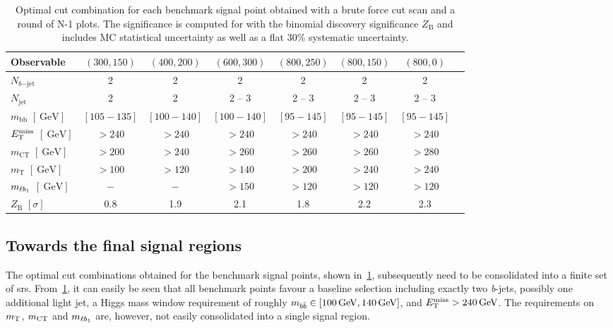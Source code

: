 \begin{table}
	\begin{center}
	\small
			\begin{tabular} {l c c c c c c c}
				\toprule
				Observable &  $(300,150)$ & $(400,200)$ & $(600,300)$  & $(800,250)$ & $(800,150)$ & $(800,0)$ \\
				\midrule
				$N_{b\mathrm{-jet}}$ &  2 & 2 & 2 & 2 & 2 & 2 \\
				$N_\mathrm{jet}$ & 2 & 2 & 2 -- 3 & 2 -- 3  & 2 -- 3 & 2 -- 3\\
				$m_\mathrm{bb}$  $[\SI{}{\GeV}]$& $[105-135]$ & $[100-140]$ & $[100-140]$ & $[95-145]$ & $[95-145]$ & $[95-145]$ \\
				$E_{\textrm{T}}^{\textrm{miss}}$ $[\SI{}{\GeV}]$ & $>240$ & $>240$ & $>240$ & $>240$ & $>240$  & $>240$\\
				$m_\mathrm{CT}$ $[\SI{}{\GeV}]$ &  $>200$ & $>240$ & $>260$ & $>260$ & $>260$   & $>280$ \\
				$m_\mathrm{T}$ $[\SI{}{\GeV}]$ &  $>100$ & $>120$ & $>140$ & $>200$ & $>240$ & $>240$ \\
				$m_{\ell b_{1}}$ $[\SI{}{\GeV}]$ &  $-$ & $-$ & $>150$ & $>120$ & $>120$ & $>120$ \\
				\midrule
				$Z_\mathrm{B}$ $[\sigma]$ & \multicolumn{1}{c}{0.8} & \multicolumn{1}{c}{1.9} & \multicolumn{1}{c}{2.1} & \multicolumn{1}{c}{1.8} & \multicolumn{1}{c}{2.2} & \multicolumn{1}{c}{2.3} \\
				\bottomrule
			\end{tabular}
		\caption{Optimal cut combination for each benchmark signal point obtained with a brute force cut scan and a round of N-1 plots. The significance is computed for \onethirtynineifb with the binomial discovery significance $Z_\mathrm{B}$ and includes MC statistical uncertainty as well as a flat 30\% systematic uncertainty.}
		\label{tab:cut_scan_results}
	\end{center}
\end{table}




\subsection{Towards the final signal regions}

The optimal cut combinations obtained for the benchmark signal points, shown in~\cref{tab:cut_scan_results}, subsequently need to be consolidated into a finite set of \glspl{sr}. From~\cref{tab:cut_scan_results}, it can easily be seen that all benchmark points favour a baseline selection including exactly two \textit{b}-jets, possibly one additional light jet, a Higgs mass window requirement of roughly $\mbb\in [\SI{100}{\GeV},\SI{140}{\GeV}]$, and $\etmiss > \SI{240}{\GeV}$. The requirements on $m_{\textrm{T}}$, $m_{\textrm{CT}}$ and $m_{\ell b_{1}}$ are, however, not easily consolidated into a single signal region.

